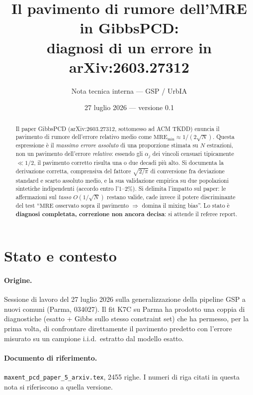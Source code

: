 \documentclass[11pt,a4paper]{article}
\title{\textbf{Il pavimento di rumore dell'MRE in GibbsPCD:\\
diagnosi di un errore in arXiv:2603.27312}}
\author{Nota tecnica interna --- GSP / UrbIA}
\date{27 luglio 2026 \quad --- \quad versione 0.1}
\newcommand{\MRE}{\mathrm{MRE}}
\begin{document}
\maketitle

\begin{abstract}
\noindent
Il paper GibbsPCD (arXiv:2603.27312, sottomesso ad ACM TKDD) enuncia il
pavimento di rumore dell'errore relativo medio come $\MRE_{\min}\approx
1/(2\sqrt{N})$. Questa espressione è il \emph{massimo errore assoluto}
di una proporzione stimata su $N$ estrazioni, non un pavimento
dell'errore \emph{relativo}: essendo gli $\alpha_j$ dei vincoli
censuari tipicamente $\ll 1/2$, il pavimento corretto risulta una o due
decadi più alto. Si documenta la derivazione corretta, comprensiva del
fattore $\sqrt{2/\pi}$ di conversione fra deviazione standard e scarto
assoluto medio, e la sua validazione empirica su due popolazioni
sintetiche indipendenti (accordo entro l'1--2\%). Si delimita l'impatto
sul paper: le affermazioni sul \emph{tasso} $O(1/\sqrt{N})$ restano
valide, cade invece il potere discriminante del test ``$\MRE$ osservato
sopra il pavimento $\Rightarrow$ domina il mixing bias''.
Lo stato è \textbf{diagnosi completata, correzione non ancora decisa}:
si attende il referee report.
\end{abstract}

\tableofcontents

\section{Stato e contesto}

\paragraph{Origine.} Sessione di lavoro del 27 luglio 2026 sulla
generalizzazione della pipeline GSP a nuovi comuni (Parma, 034027). Il
fit K7C su Parma ha prodotto una coppia di diagnostiche
(esatto + Gibbs sullo stesso constraint set) che ha permesso, per la
prima volta, di confrontare direttamente il pavimento predetto con
l'errore misurato su un campione i.i.d.\ estratto dal modello esatto.

\paragraph{Documento di riferimento.}
\texttt{maxent\_pcd\_paper\_5\_arxiv.tex}, 2455 righe. I numeri di riga
citati in questa nota si riferiscono a quella versione.
\end{document}
